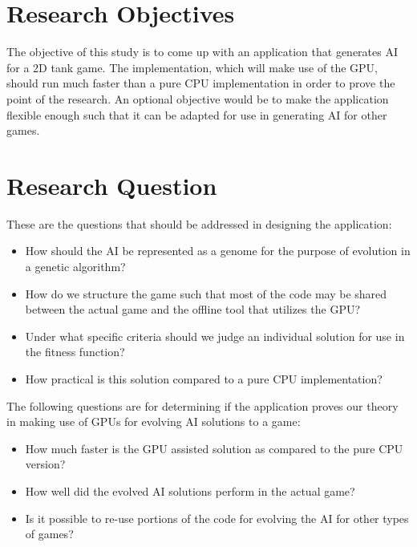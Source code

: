 
\section{Research Objectives}

The objective of this study is to come up with an application that generates AI for
a 2D tank game. The implementation, which will make use of the GPU, should run
much faster than a pure CPU implementation in order to prove the point of the research.
An optional objective would be to make the application flexible enough such that it
can be adapted for use in generating AI for other games.

\section{Research Question}

These are the questions that should be addressed in designing the application:

\begin{itemize}
 \item How should the AI be represented as a genome for the purpose of evolution in a genetic algorithm?

 \item How do we structure the game such that most of the code may be shared between
the actual game and the offline tool that utilizes the GPU?

 \item Under what specific criteria should we judge an individual solution for use in the
fitness function?

 \item How practical is this solution compared to a pure CPU implementation?
\end{itemize}


The following questions are for determining if the application proves our theory
in making use of GPUs for evolving AI solutions to a game:

\begin{itemize}
 \item How much faster is the GPU assisted solution as compared to the pure CPU
 version?
 
 \item How well did the evolved AI solutions perform in the actual game?
 
 \item Is it possible to re-use portions of the code for evolving the AI for other
 types of games?
\end{itemize}

